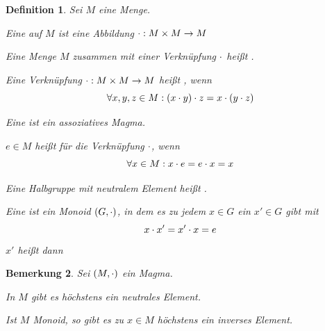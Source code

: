 \documentclass[a4paper,10pt,german]{scrbook}
\theoremstyle{saetze}
\theoremstyle{definitionen}
\newtheorem{Def}{Definition}[section]
\newtheorem{Bem}[Def]{Bemerkung}
\begin{document}
\begin{Def} 
    Sei $M$ eine Menge.

    \begin{enum}
        \item Eine  auf $M$ ist eine Abbildung $\cdot: M
              \times M \rightarrow M $

        \item Eine Menge $M$ zusammen mit einer Verknüpfung $\cdot$ heißt
              .

        \item Eine Verknüpfung $\cdot : M \times M \rightarrow M$ heißt ,
        wenn \[\forall x,y,z \in M: (x\cdot y)\cdot z=x\cdot(y\cdot z)\]

        \item Eine  ist ein assoziatives Magma.
    
        \item $e \in M$ heißt  für die Verknüpfung $\cdot$,
        wenn \[\forall x \in M: x \cdot e = e \cdot x = x\]
          
        \item Eine Halbgruppe mit neutralem Element heißt .

        \item Eine  ist ein Monoid $(G,\cdot)$, in dem es zu jedem $x
        \in G$ ein $x' \in G$ gibt mit \[ x \cdot x' = x' \cdot x = e \] $x'$ heißt
        dann 
    \end{enum}
\end{Def}

\begin{Bem}
    Sei $(M,\cdot)$ ein Magma.
    
    \begin{enum}
        \item In $M$ gibt es höchstens ein neutrales Element.

        \item Ist $M$ Monoid, so gibt es zu $x \in M$ höchstens ein inverses 
        Element.
    \end{enum}
\end{Bem}
\end{document}
